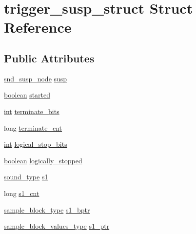 \hypertarget{structtrigger__susp__struct}{}\section{trigger\+\_\+susp\+\_\+struct Struct Reference}
\label{structtrigger__susp__struct}
\subsection*{Public Attributes}
\begin{DoxyCompactItemize}
\item 
\hyperlink{sound_8h_a6b268203688a934bd798ceb55f85d4c0}{snd\+\_\+susp\+\_\+node} \hyperlink{structtrigger__susp__struct_a1c993fa171691590b7e9cbddeaec9d8c}{susp}
\item 
\hyperlink{cext_8h_a7670a4e8a07d9ebb00411948b0bbf86d}{boolean} \hyperlink{structtrigger__susp__struct_ab00d9df745d6d4cc5689b41a7a82cfaf}{started}
\item 
\hyperlink{xmltok_8h_a5a0d4a5641ce434f1d23533f2b2e6653}{int} \hyperlink{structtrigger__susp__struct_a8c694a5a1bbdc9063b7989f4d4e8229c}{terminate\+\_\+bits}
\item 
long \hyperlink{structtrigger__susp__struct_ab6298937f1d495007331e6779439bd84}{terminate\+\_\+cnt}
\item 
\hyperlink{xmltok_8h_a5a0d4a5641ce434f1d23533f2b2e6653}{int} \hyperlink{structtrigger__susp__struct_a9200f73e64b6927210245d30adea0974}{logical\+\_\+stop\+\_\+bits}
\item 
\hyperlink{cext_8h_a7670a4e8a07d9ebb00411948b0bbf86d}{boolean} \hyperlink{structtrigger__susp__struct_afe7385c2458f6c1b7c469e75dbfa005d}{logically\+\_\+stopped}
\item 
\hyperlink{sound_8h_a792cec4ed9d6d636d342d9365ba265ea}{sound\+\_\+type} \hyperlink{structtrigger__susp__struct_aa241f1b73667b161d9ba1a6980d065e6}{s1}
\item 
long \hyperlink{structtrigger__susp__struct_adac7154ef275314b3ab95811f4c14584}{s1\+\_\+cnt}
\item 
\hyperlink{sound_8h_a6becaef7eb98c0e45b13f72dadf07b23}{sample\+\_\+block\+\_\+type} \hyperlink{structtrigger__susp__struct_ad0d393193735dcaaab4367bec277f374}{s1\+\_\+bptr}
\item 
\hyperlink{sound_8h_a83d17f7b465d1591f27cd28fc5eb8a03}{sample\+\_\+block\+\_\+values\+\_\+type} \hyperlink{structtrigger__susp__struct_ad6a3f6adfae8f0c10deabc024c5398bb}{s1\+\_\+ptr}
\item 

\end{DoxyCompactItemize}

